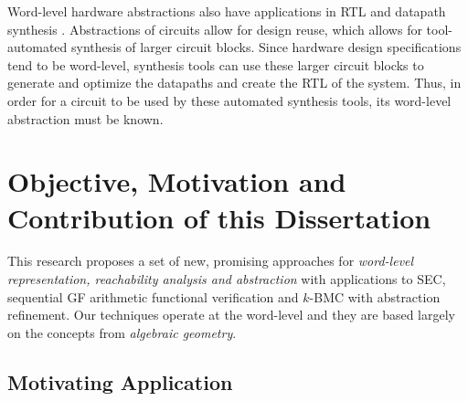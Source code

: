 Word-level hardware abstractions also have applications in RTL and datapath 
synthesis \cite{demicheli:iccad_98} \cite{demicheli:dac_99}
\cite{demicheli:tcad_03}. 
Abstractions of circuits allow for design reuse, which allows for tool-automated 
synthesis of larger circuit blocks.
Since hardware design specifications tend to be word-level, synthesis tools 
can use these larger circuit blocks to generate and optimize the
datapaths and create the RTL of the system. Thus, in order for a circuit to 
be used by these automated synthesis tools, its word-level abstraction must
be known.



\section{Objective, Motivation and Contribution of this Dissertation}
This research proposes a
set of new, promising approaches for {\it word-level representation,
reachability analysis and abstraction} with applications to SEC, sequential GF
arithmetic functional verification and 
$k$-BMC with abstraction refinement. Our techniques operate at the word-level and they are based
largely on the concepts from {\it algebraic geometry}. 

\subsection{Motivating Application}

